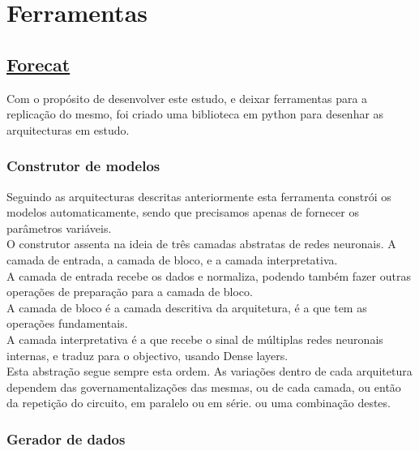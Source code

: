 \chapter{Ferramentas}

\section{\href{https://github.com/alquimodelia/forecat/tree/main/forecat}{Forecat}\label{se:forecat}}


Com o propósito de desenvolver este estudo, e deixar ferramentas para a replicação do mesmo, foi criado uma biblioteca em python para desenhar as arquitecturas em estudo.\\

\subsection{Construtor de modelos}

Seguindo as arquitecturas descritas anteriormente esta ferramenta constrói os modelos automaticamente, sendo que precisamos apenas de fornecer os parâmetros variáveis.\\
O construtor assenta na ideia de três camadas abstratas de redes neuronais. A camada de entrada, a camada de bloco, e a camada interpretativa.\\
A camada de entrada recebe os dados e normaliza, podendo também fazer outras operações de preparação para a camada de bloco.\\
A camada de bloco é a camada descritiva da arquitetura, é a que tem as operações fundamentais.\\
A camada interpretativa é a que recebe o sinal de múltiplas redes neuronais internas, e traduz para o objectivo, usando Dense layers. \\

Esta abstração segue sempre esta ordem. As variações dentro de cada arquitetura dependem das governamentalizações das mesmas, ou de cada camada, ou então da repetição do circuito, em paralelo ou em série. ou uma combinação destes.\\

\subsection{Gerador de dados}

